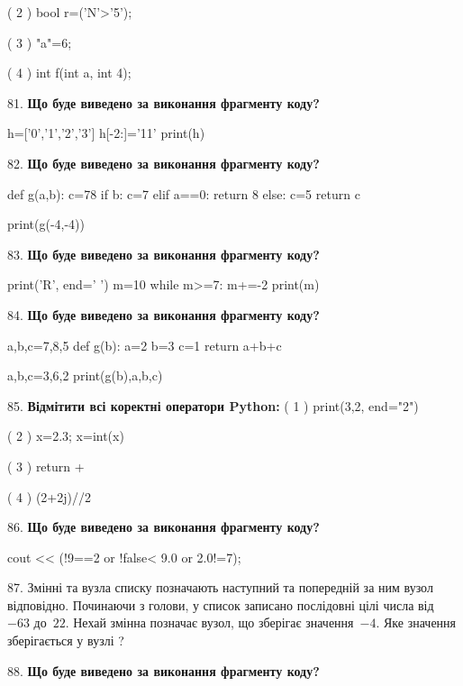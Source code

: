 \documentclass[11pt]{article}
\begin{document}
( 2 ) bool r=('N'>'5');

( 3 ) "a"=6;

( 4 ) int f(int a, int 4);
\par\vspace{5mm}
81. \textbf{Що буде виведено за виконання фрагменту коду?}

h=['0','1','2','3']
h[-2:]='11'
print(h)

\par\vspace{5mm}
82. \textbf{Що буде виведено за виконання фрагменту коду?}

def g(a,b):
    c=78
    if b:
        c=7
    elif a==0:
         return 8
    else: 
        c=5
    return c

print(g(-4,-4))
\par\vspace{5mm}
83. \textbf{Що буде виведено за виконання фрагменту коду?}

print('R', end=' ')
m=10
while m>=7:
    m+=-2
print(m)

\par\vspace{5mm}
84. \textbf{Що буде виведено за виконання фрагменту коду?}

a,b,c=7,8,5
def g(b):
    a=2
    b=3
    c=1
    return a+b+c

a,b,c=3,6,2
print(g(b),a,b,c)
\par\vspace{5mm}
85. %
\textbf{Відмітити всі коректні оператори Python:}
( 1 ) print(3,2, end="2")

( 2 ) x=2.3; x=int(x)

( 3 ) return +

( 4 ) (2+2j)//2
\par\vspace{5mm}
86. \textbf{Що буде виведено за виконання фрагменту коду?}

cout << (!9==2 or !false< 9.0 or 2.0!=7);
\par\vspace{5mm}
87. 
Змінні  та  вузла списку позначають наступний та попередній за ним вузол відповідно. Починаючи з голови, у список записано послідовні цілі числа від~$-63$ до~$22$. Нехай змінна  позначає вузол, що зберігає значення~$-4$.
Яке значення зберігається у вузлі  ?
\par\vspace{5mm}
88. \textbf{Що буде виведено за виконання фрагменту коду?}
\end{document}
